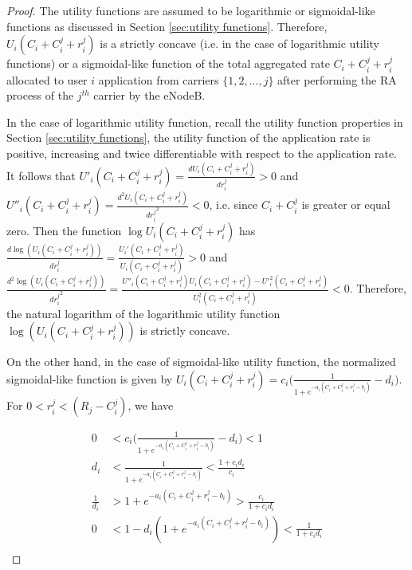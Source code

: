 \documentclass[journal]{IEEEtran} 				\IEEEoverridecommandlockouts 						\usepackage{amsmath,amssymb}
\begin{document}
\begin{proof}
The utility functions are assumed to be logarithmic or sigmoidal-like functions as discussed in Section \ref{sec:utility functions}. Therefore, $U_i(C_i+C_i^j+r_i^j)$ is a strictly concave (i.e. in the case of logarithmic utility functions) or a sigmoidal-like function of the total aggregated rate $C_i+C_i^j+r_i^j$ allocated to user $i$ application from carriers $\{1,2,...,j\}$ after performing the RA process of the $j^{th}$ carrier by the eNodeB.

In the case of logarithmic utility function, recall the utility function properties in Section \ref{sec:utility functions}, the utility function of the application rate is positive, increasing and twice differentiable with respect to the application rate. It follows that $U'_i(C_i+C_i^j+r_i^j) = \frac{dU_i(C_i+C_i^j+r_i^j)}{dr_i^j} > 0$ and $U''_i(C_i+C_i^j+r_i^j) = \frac{d^2U_i(C_i+C_i^j+r_i^j)}{{dr_i^j}^2} < 0$, i.e. since $C_i+C_i^j$ is greater or equal zero. Then the function $\log U_i(C_i+C_i^j+r_i^j)$ has $\frac{d \log (U_i(C_i+C_i^j+r_i^j))}{dr_i^j}=\frac{U_i'(C_i+C_i^j+r_i^j)}{U_i(C_i+C_i^j+r_i^j)} > 0$ and $\frac{d^2 \log (U_i(C_i+C_i^j+r_i^j))}{{dr_i^j}^2}=\frac{U''_i(C_i+C_i^j+r_i^j)U_i(C_i+C_i^j+r_i^j)-U'^2_i(C_i+C_i^j+r_i^j)}{U^2_i(C_i+C_i^j+r_i^j)} < 0$. Therefore, the natural logarithm of the logarithmic utility function $\log(U_i(C_i+C_i^j+r_i^j))$ is strictly concave.

On the other hand, in the case of sigmoidal-like utility function, the normalized sigmoidal-like function is given by $U_i(C_i+C_i^j+r_i^j)=c_i\Big(\frac{1}{1+e^{-a_i(C_i+C_i^j+r_i^j-b_i)}}-d_i\Big)$. For $0 < r_i^j < (R_j-C_i^j)$, we have

\begin{equation*}\label{eqn:sigmoid_bound}
\begin{aligned}
0&<c_i\Big(\frac{1}{1+e^{-a_i(C_i+C_i^j+r_i^j-b_i)}}-d_i\Big)<1\\
d_i&<\frac{1}{1+e^{-a_i(C_i+C_i^j+r_i^j-b_i)}}<\frac{1+c_id_i}{c_i}\\
\frac{1}{d_i}&>{1+e^{-a_i(C_i+C_i^j+r_i^j-b_i)}}>\frac{c_i}{1+c_id_i}\\
0&<1-d_i({1+e^{-a_i(C_i+C_i^j+r_i^j-b_i)}})<\frac{1}{1+c_id_i}\\
\end{aligned}
\end{equation*}


\end{proof}
\end{document}
